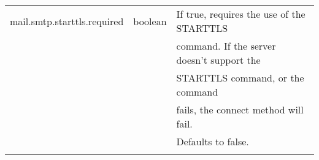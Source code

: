 \documentclass[envcountsame,envcountchap,letterpaper]{svmono}
\begin{document}
\begin{table}
\begin{tabular}{lll}
mail.smtp.starttls.required & boolean & If true, requires the use of the STARTTLS \\ & & command. If the server doesn't support the \\ & & STARTTLS command, or the command \\ & & fails, the connect method will fail. \\ & &Defaults to false. \\
\noalign{\smallskip}\hline
\end{tabular}
\end{table}

\backmatter

\printindex

\begin{thebibliography}{99.}
\end{thebibliography}
\end{document}

